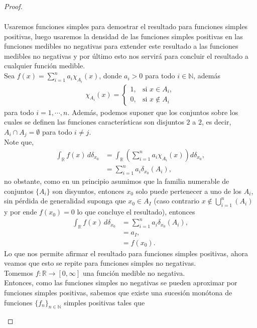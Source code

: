 \begin{proof}
\begin{enumerate}
\begin{align*}
      \end{align*}
      Usaremos funciones simples para demostrar el resultado para funciones simples positivas, luego usaremos la densidad de las funciones simples positivas en las funciones medibles no negativas para extender este resultado a las funciones medibles no negativas y por último esto nos servirá para concluir el resultado a cualquier función medible.\\
      Sea $f(x) = \sum_{i=1}^n a_i \chi_{A_i}(x)$, donde $a_i>0$ para todo $i\in\mathbb{N}$, además 
      \begin{align*}
        \chi_{A_i}(x) = \begin{cases} 
          1, & \text{si } x \in A_i,\\
          0, & \text{si } x \notin A_i
        \end{cases}
      \end{align*}
      para todo $i = 1,\cdots,n$. Además, podemos suponer que los conjuntos sobre los cuales se definen las funciones características son disjuntos $2$ a $2$, es decir, $A_i \cap A_j = \emptyset$ para todo $i \neq j$.\\
      Note que,
      \begin{align*}
        \int_{\mathbb{R}} f(x) \, d\delta_{x_0} &= \int_{\mathbb{R}} \left( \sum_{i=1}^n a_i \chi_{A_i}(x) \right) d\delta_{x_0},\\ 
        &= \sum_{i=1}^n a_i \delta_{x_0}(A_i),
      \end{align*}
      no obstante, como en un principio asumimos que la familia numerable de conjuntos $\{A_i\}$ son disyuntos, entonces $x_0$ solo puede pertenecer a uno de los $A_i$, sin pérdida de generalidad suponga que $x_0\in A_{I}$ (caso contrario $x\notin \bigcup_{i=1}^{n}(A_i)$ y por ende $f(x_0)=0$ lo que concluye el resultado), entonces
      \begin{align*}
        \int_{\mathbb{R}} f(x) \, d\delta_{x_0} &= \sum_{i=1}^n a_i \delta_{x_0}(A_i),\\
        &= a_I,\\
        &= f(x_0).
      \end{align*}
      Lo que nos permite afirmar el resultado para funciones simples positivas, ahora veamos que esto se repite para funciones simples no negativas.\\
      Tomemos $f:\mathbb{R}\to[0, \infty]$ una función medible no negativa.\\ Entonces, como las funciones simples no negativas se pueden aproximar por funciones simples positivas, sabemos que existe una sucesión monótona de funciones $\{f_n\}_{n\in\mathbb{N}}$ simples positivas tales que

\end{enumerate}
\end{proof}
